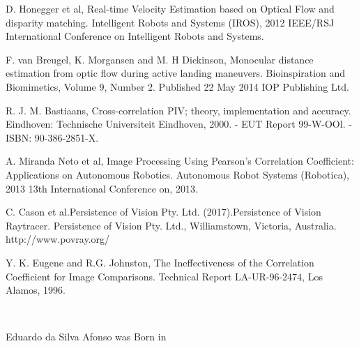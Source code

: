 \documentclass[letterpaper, 10 pt,conference]{ieeeconf}  %
\begin{document}
\begin{thebibliography}{99}

         D. Honegger et al, Real-time Velocity Estimation based on Optical Flow and disparity matching.
         Intelligent Robots and Systems (IROS), 2012 IEEE/RSJ International Conference on Intelligent Robots and Systems.
        
         F. van Breugel, K. Morgansen and M. H Dickinson, Monocular distance estimation from optic flow during
        active landing maneuvers. Bioinspiration and Biomimetics, Volume 9, Number 2. Published 22 May 2014 IOP Publishing Ltd.


	 R. J. M. Bastiaans, Cross-correlation PIV; theory, implementation and accuracy. 
        Eindhoven: Technische Universiteit Eindhoven, 2000. - EUT Report 99-W-OOl. - ISBN: 90-386-2851-X.

         A. Miranda Neto et al, Image Processing Using Pearson's Correlation Coefficient: 
        Applications on Autonomous Robotics. 
        Autonomous Robot Systems (Robotica), 2013 13th International Conference on, 2013.
        
          C. Cason et al.Persistence of Vision Pty. Ltd. (2017).Persistence of Vision Raytracer.
	Persistence of Vision Pty. Ltd., Williamstown, Victoria, Australia. http://www.povray.org/
	
	 Y. K. Eugene and R.G. Johnston, The Ineffectiveness of the Correlation Coefficient for Image Comparisons.
        Technical Report LA-UR-96-2474, Los Alamos, 1996.
	
	
        

	

        
        
	
\end{thebibliography}
~\\
\begin{biography}{Eduardo da Silva Afonso}
was Born in 
\end{biography}
\end{document}

